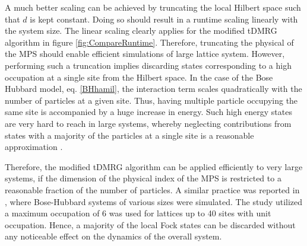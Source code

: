 A much better scaling can be achieved by truncating the local Hilbert space such that $d$ is kept constant. Doing so should result in a runtime scaling linearly with the system size. The linear scaling clearly applies for the modified tDMRG algorithm in figure \ref{fig:CompareRuntime}. Therefore, truncating the physical of the MPS should enable efficient simulations of large lattice system. However, performing such a truncation implies discarding states corresponding to a high occupation at a single site from the Hilbert space.
In the case of the Bose Hubbard model, eq. \eqref{BHhamil}, the interaction term scales quadratically with the number of particles at a given site. Thus, having multiple particle occupying the same site is accompanied by a huge increase in energy. Such high energy states are very hard to reach in large systems, whereby neglecting contributions from states with a majority of the particles at a single site is a reasonable approximation \cite{Daley2004}.

Therefore, the modified tDMRG algorithm can be applied efficiently to very large systems, if the dimension of the physical index of the MPS is restricted to a reasonable fraction of the number of particles. A similar practice was reported in \cite{Braun2015}, where Bose-Hubbard systems of various sizes were simulated. The study utilized a maximum occupation of 6 was used for lattices up to 40 sites with unit occupation. Hence, a majority of the local Fock states can be discarded without any noticeable effect on the dynamics of the overall system.